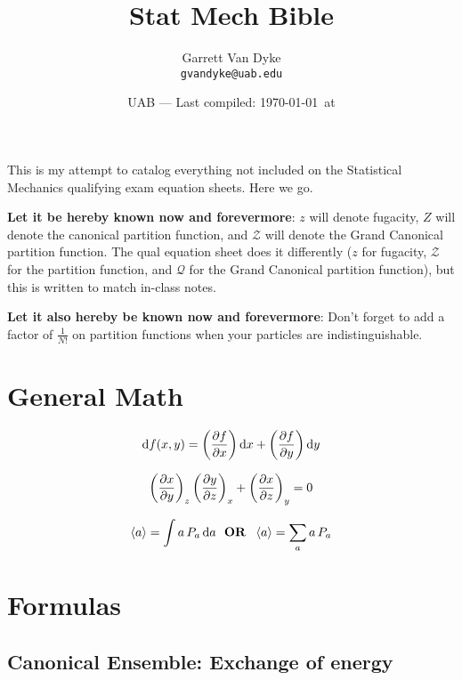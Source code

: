 \documentclass{article}
\title{Stat Mech Bible} %
\author{Garrett Van Dyke\\ \texttt{gvandyke@uab.edu}} %
\date{UAB --- Last compiled: \today\ at \currenttime} %
\begin{document}
\maketitle %



This is my attempt to catalog everything not included on the Statistical Mechanics qualifying exam equation sheets. Here we go. \medskip

\textbf{Let it be hereby known now and forevermore}: $z$ will denote fugacity, $Z$ will denote the canonical partition function, and $\mathcal{Z}$ will denote the Grand Canonical partition function. The qual equation sheet does it differently ($z$ for fugacity, $\mathcal{Z}$ for the partition function, and $\mathcal{Q}$ for the Grand Canonical partition function), but this is written to match in-class notes.\medskip

\textbf{Let it also hereby be known now and forevermore}: Don't forget to add a factor of $\frac{1}{N!}$ on partition functions when your particles are indistinguishable.

\section{General Math}

\begin{equation}
	\dif f(x,y)= \left(\pdv{f}{x}\right)\dif x + \left(\pdv{f}{y}\right)\dif y
\end{equation}

\begin{equation}
	\left(\pdv{x}{y}\right)_z\left(\pdv{y}{z}\right)_x+\left(\pdv{x}{z}\right)_y=0
\end{equation}

\begin{equation}
	\left\langle a \right\rangle=\int a \, P_a \dif a \; \textbf{ OR } \; \left\langle a \right\rangle=\sum_a a \, P_a
\end{equation}


\section{Formulas}
\subsection{Canonical Ensemble: \normalfont Exchange of energy}
\end{document}
